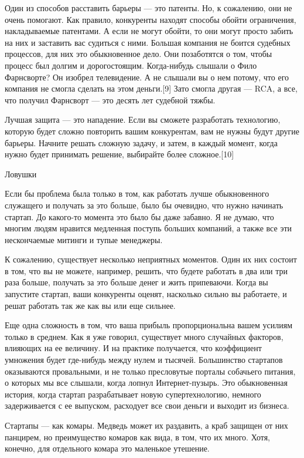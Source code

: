 \documentclass[ebook,12pt,oneside,openany]{memoir}
\begin{document}
Один из способов расставить барьеры — это патенты. Но, к сожалению,
они не очень помогают. Как правило, конкуренты находят способы обойти
ограничения, накладываемые патентами. А если не могут обойти, то они
могут просто забить на них и заставить вас судиться с ними. Большая
компания не боится судебных процессов, для них это обыкновенное дело.
Они позаботятся о том, чтобы процесс был долгим и дорогостоящим.
Когда-нибудь слышали о Фило Фарнсворте? Он изобрел телевидение. А не
слышали вы о нем потому, что его компания не смогла сделать на этом
деньги.[9] Зато смогла другая — RCA, а все, что получил Фарнсворт —
это десять лет судебной тяжбы.

Лучшая защита — это нападение. Если вы сможете разработать технологию,
которую будет сложно повторить вашим конкурентам, вам не нужны будут
другие барьеры. Начните решать сложную задачу, и затем, в каждый
момент, когда нужно будет принимать решение, выбирайте более
сложное.[10]

Ловушки

Если бы проблема была только в том, как работать лучше обыкновенного
служащего и получать за это больше, было бы очевидно, что нужно
начинать стартап. До какого-то момента это было бы даже забавно. Я не
думаю, что многим людям нравится медленная поступь больших компаний, а
также все эти нескончаемые митинги и тупые менеджеры.

К сожалению, существует несколько неприятных моментов. Один их них
состоит в том, что вы не можете, например, решить, что будете работать
в два или три раза больше, получать за это больше денег и жить
припеваючи. Когда вы запустите стартап, ваши конкуренты оценят,
насколько сильно вы работаете, и решат работать так же как вы или еще
сильнее.

Еще одна сложность в том, что ваша прибыль пропорциональна вашем
усилиям только в среднем. Как я уже говорил, существует много
случайных факторов, влияющих на ее величину. И на практике получается,
что коэффициент умножения будет где-нибудь между нулем и тысячей.
Большинство стартапов оказываются провальными, и не только пресловутые
порталы собачьего питания, о которых мы все слышали, когда лопнул
Интернет-пузырь. Это обыкновенная история, когда стартап разрабатывает
новую супертехнологию, немного задерживается с ее выпуском, расходует
все свои деньги и выходит из бизнеса.

Стартапы — как комары. Медведь может их раздавить, а краб защищен от
них панцирем, но преимущество комаров как вида, в том, что их много.
Хотя, конечно, для отдельного комара это маленькое утешение.
\end{document}
